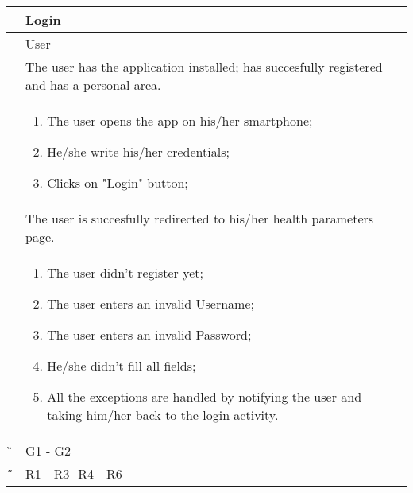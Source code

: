 \begin{center}
	\begin{longtable}{ | p{} | p{} | }
		\hline
		 \A &   Login \\ 

		\hline
		 \B &  User \\ 

		\hline
  		 \C &  The user has the application installed; has succesfully registered and has a personal area.\\ 

		\hline
		\D & \begin{enumerate}
			\item The user opens the app on his/her smartphone;
			\item He/she write his/her credentials;
			\item Clicks on "Login" button;
		\end{enumerate} \\

		\hline
		\E & The user is succesfully redirected to his/her health parameters page.\\

		\hline
		\F & \begin{enumerate}
			\item The user didn't register yet;
			\item The user enters an invalid Username;
			\item The user enters an invalid Password;
			\item He/she didn't fill all fields;
			\item All the exceptions are handled by notifying the user and taking him/her back to the login activity.
		\end{enumerate} \\
		
		\hline
		\G & G1 - G2\\

		\hline
		\H & R1 - R3- R4 - R6 \\
		\hline

	\end{longtable}
\end{center}